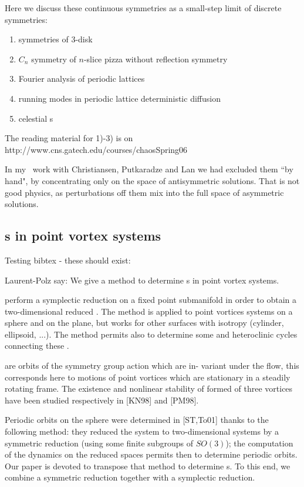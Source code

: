         Here we discuss these continuous symmetries as
a small-step limit of discrete symmetries:

\begin{enumerate}
\item
        symmetries of 3-disk
\item
        $C_n$ symmetry of $n$-slice pizza without reflection symmetry
\item
        Fourier analysis of periodic lattices
\item
        running modes in periodic lattice deterministic
           diffusion
\item
    celestial {\rpo s}
\end{enumerate}

The reading material for 1)-3) is on
http://www.cns.gatech.edu/courses/chaosSpring06

In my \KS\ work with Christiansen, Putkaradze and Lan we
had excluded them ``by hand", by concentrating only on the space of
antisymmetric solutions. That is not good physics, as perturbations off
them mix into the full space of asymmetric solutions.



\subsection{{\Rpo s} in point vortex systems}

Testing bibtex - these should exist:
 

Laurent-Polz say: We give a method to
determine {\rpo s} in point vortex systems.

perform a symplectic reduction on a fixed point submanifold in
order to obtain a two-dimensional reduced \statesp. The method
is applied to point vortices systems on a sphere and on the
plane, but works for other surfaces with isotropy (cylinder,
ellipsoid, ...). The method permits also to determine some
{\reqva} and heteroclinic cycles connecting these {\reqva}.

{\Reqva} are orbits of the symmetry group action which are in-
variant under the flow, this corresponds here to motions of
point vortices which are stationary in a steadily rotating
frame. The existence and nonlinear stability of {\reqva} formed
of three vortices have been studied respectively in [KN98] and
[PM98].

Periodic orbits on the sphere were determined in [ST,To01]
thanks to the following method: they reduced the system to
two-dimensional systems by a symmetric reduction (using some
finite subgroups of $SO(3)$); the computation of the dynamics
on the reduced spaces permits then to determine periodic
orbits. Our paper is devoted to transpose that method to
determine {\rpo s}. To this end, we combine a symmetric
reduction together with a symplectic reduction.

